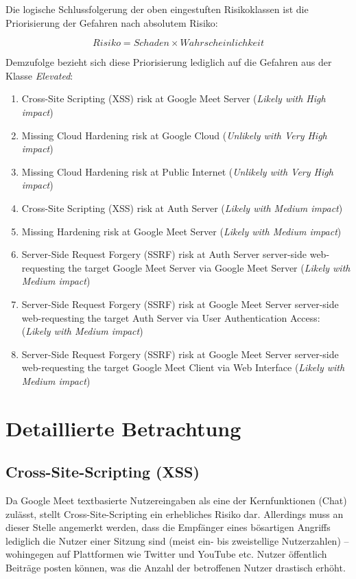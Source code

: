 \documentclass{article}
\begin{document}
Die logische Schlussfolgerung der oben eingestuften Risikoklassen ist die Priorisierung 
der Gefahren nach absolutem Risiko:

$$Risiko = Schaden \times Wahrscheinlichkeit$$

\vspace{0.5em}

Demzufolge bezieht sich diese Priorisierung lediglich auf die Gefahren aus der Klasse 
\textit{Elevated}:

\begin{enumerate}
	\item Cross-Site Scripting (XSS) risk at Google Meet Server (\textit{Likely with High impact})
	\item Missing Cloud Hardening risk at Google Cloud (\textit{Unlikely with Very High impact})
	\item Missing Cloud Hardening risk at Public Internet (\textit{Unlikely with Very High impact})
	\item Cross-Site Scripting (XSS) risk at Auth Server (\textit{Likely with Medium impact})
	\item Missing Hardening risk at Google Meet Server (\textit{Likely with Medium impact})
	\item Server-Side Request Forgery (SSRF) risk at Auth Server server-side web-requesting the target Google Meet Server via Google Meet Server (\textit{Likely with Medium impact})
	\item Server-Side Request Forgery (SSRF) risk at Google Meet Server server-side web-requesting the target Auth Server via User Authentication Access: (\textit{Likely with Medium impact})
	\item Server-Side Request Forgery (SSRF) risk at Google Meet Server server-side web-requesting the target Google Meet Client via Web Interface (\textit{Likely with Medium impact})
\end{enumerate}

\section{Detaillierte Betrachtung}

\subsection{Cross-Site-Scripting (XSS)}

Da Google Meet textbasierte Nutzereingaben als eine der Kernfunktionen (Chat) zulässt, 
stellt Cross-Site-Scripting ein erhebliches Risiko dar. Allerdings muss an dieser Stelle 
angemerkt werden, dass die Empfänger eines bösartigen Angriffs lediglich die Nutzer einer Sitzung 
sind (meist ein- bis zweistellige Nutzerzahlen) – wohingegen auf Plattformen wie Twitter 
und YouTube etc. Nutzer öffentlich Beiträge posten können, was die Anzahl der betroffenen 
Nutzer drastisch erhöht.
\end{document}
